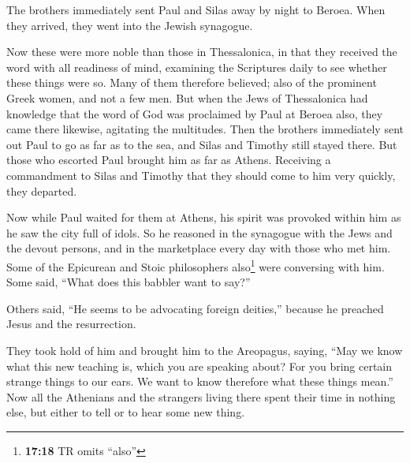  The brothers immediately sent Paul and Silas away by
night to Beroea. When they arrived, they went into the Jewish synagogue.

 Now these were more noble than those in Thessalonica, in
that they received the word with all readiness of mind, examining the
Scriptures daily to see whether these things were so. 
Many of them therefore believed; also of the prominent Greek women, and
not a few men.  But when the Jews of Thessalonica had
knowledge that the word of God was proclaimed by Paul at Beroea also,
they came there likewise, agitating the multitudes.  Then
the brothers immediately sent out Paul to go as far as to the sea, and
Silas and Timothy still stayed there.  But those who
escorted Paul brought him as far as Athens. Receiving a commandment to
Silas and Timothy that they should come to him very quickly, they
departed.

 Now while Paul waited for them at Athens, his spirit was
provoked within him as he saw the city full of idols.  So
he reasoned in the synagogue with the Jews and the devout persons, and
in the marketplace every day with those who met him. 
Some of the Epicurean and Stoic philosophers also\footnote{\textbf{17:18}
  TR omits ``also''} were conversing with him. Some said, ``What does
this babbler want to say?''

Others said, ``He seems to be advocating foreign deities,'' because he
preached Jesus and the resurrection.

 They took hold of him and brought him to the Areopagus,
saying, ``May we know what this new teaching is, which you are speaking
about?  For you bring certain strange things to our ears.
We want to know therefore what these things mean.''  Now
all the Athenians and the strangers living there spent their time in
nothing else, but either to tell or to hear some new thing.

